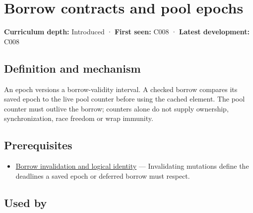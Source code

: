 \hypertarget{appendix-aa405b7c3903}{}\label{referencestart:appendix-aa405b7c3903}
\section{Borrow contracts and pool epochs}\label{appendix-aa405b7c3903-borrow-contracts-and-pool-epochs}

\hypertarget{appendix-aa405b7c3903-borrow-contracts-and-pool-epochs}{}

\textbf{Curriculum depth:} Introduced · \textbf{First seen:} C008 · \textbf{Latest development:} C008

\begin{allmightroledefinition}

\subsection{Definition and mechanism}\label{appendix-aa405b7c3903-definition-and-mechanism}

\hypertarget{appendix-aa405b7c3903-definition-and-mechanism}{}

An epoch versions a borrow-validity interval. A checked borrow compares its saved epoch to the live pool counter before using the cached element. The pool counter must outlive the borrow; counters alone do not supply ownership, synchronization, race freedom or wrap immunity.

\end{allmightroledefinition}

\subsection{Prerequisites}\label{appendix-aa405b7c3903-prerequisites}

\hypertarget{appendix-aa405b7c3903-prerequisites}{}

\begin{itemize}
\tightlist
\item
  \hyperref[appendix-f9b8b9188c7f]{Borrow invalidation and logical identity} --- Invalidating mutations define the deadlines a saved epoch or deferred borrow must respect.
\end{itemize}

\subsection{Used by}\label{appendix-aa405b7c3903-used-by}

\hypertarget{appendix-aa405b7c3903-used-by}{}

